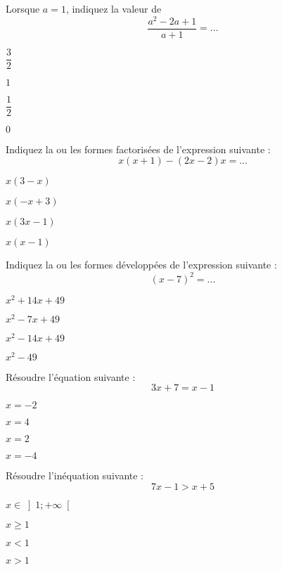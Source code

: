 \begin{qcm}
	\q{} Lorsque $a=1$, indiquez la valeur de $$\dfrac{a^2-2a+1}{a+1}=...$$
	\begin{choix2col}
		\item $\dfrac{3}{2}$
		\item $1$
		\item $\dfrac{1}{2}$
		\item $0$
	\end{choix2col}

	\q{} Indiquez la ou les formes factorisées de l'expression suivante : $$x(x+1)-(2x-2)x=...$$
	\begin{choix2col}
		\item $x(3-x)$
		\item $x(-x+3)$
		\item $x(3x-1)$
		\item $x(x-1)$
	\end{choix2col}

	\espace

	\q{} Indiquez la ou les formes développées de l'expression suivante : $$(x-7)^2=...$$
	\begin{choix2col}
		\item $x^2+14x+49$
		\item $x^2-7x+49$
		\item $x^2-14x+49$
		\item $x^2-49$
	\end{choix2col}

	\q{} Résoudre l'équation suivante : $$3x+7=x-1$$
	\begin{choix2col}
		\item $x=-2$
		\item $x=4$
		\item $x=2$
		\item $x=-4$
	\end{choix2col}

	\q{} Résoudre l'inéquation suivante : $$7x-1>x+5$$
	\begin{choix2col}
		\item $x\in\left]1;+\infty\right[$
		\item $x\geq 1$
		\item $x<1$
		\item $x>1$
	\end{choix2col}
\end{qcm}


